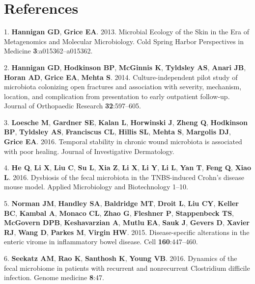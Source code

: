 \documentclass[12pt,]{article}
\begin{document}
\newpage

\section*{References}\label{references}

\hypertarget{refs}{}
\hypertarget{ref-Hannigan:2013im}{}
1. \textbf{Hannigan GD}, \textbf{Grice EA}. 2013. Microbial Ecology of
the Skin in the Era of Metagenomics and Molecular Microbiology. Cold
Spring Harbor Perspectives in Medicine \textbf{3}:a015362--a015362.

\hypertarget{ref-Hannigan:2014be}{}
2. \textbf{Hannigan GD}, \textbf{Hodkinson BP}, \textbf{McGinnis K},
\textbf{Tyldsley AS}, \textbf{Anari JB}, \textbf{Horan AD},
\textbf{Grice EA}, \textbf{Mehta S}. 2014. Culture-independent pilot
study of microbiota colonizing open fractures and association with
severity, mechanism, location, and complication from presentation to
early outpatient follow-up. Journal of Orthopaedic Research
\textbf{32}:597--605.

\hypertarget{ref-Loesche:2016ev}{}
3. \textbf{Loesche M}, \textbf{Gardner SE}, \textbf{Kalan L},
\textbf{Horwinski J}, \textbf{Zheng Q}, \textbf{Hodkinson BP},
\textbf{Tyldsley AS}, \textbf{Franciscus CL}, \textbf{Hillis SL},
\textbf{Mehta S}, \textbf{Margolis DJ}, \textbf{Grice EA}. 2016.
Temporal stability in chronic wound microbiota is associated with poor
healing. Journal of Investigative Dermatology.

\hypertarget{ref-He:2016ch}{}
4. \textbf{He Q}, \textbf{Li X}, \textbf{Liu C}, \textbf{Su L},
\textbf{Xia Z}, \textbf{Li X}, \textbf{Li Y}, \textbf{Li L}, \textbf{Yan
T}, \textbf{Feng Q}, \textbf{Xiao L}. 2016. Dysbiosis of the fecal
microbiota in the TNBS-induced Crohn's disease mouse model. Applied
Microbiology and Biotechnology 1--10.

\hypertarget{ref-Norman:2015kb}{}
5. \textbf{Norman JM}, \textbf{Handley SA}, \textbf{Baldridge MT},
\textbf{Droit L}, \textbf{Liu CY}, \textbf{Keller BC}, \textbf{Kambal
A}, \textbf{Monaco CL}, \textbf{Zhao G}, \textbf{Fleshner P},
\textbf{Stappenbeck TS}, \textbf{McGovern DPB}, \textbf{Keshavarzian A},
\textbf{Mutlu EA}, \textbf{Sauk J}, \textbf{Gevers D}, \textbf{Xavier
RJ}, \textbf{Wang D}, \textbf{Parkes M}, \textbf{Virgin HW}. 2015.
Disease-specific alterations in the enteric virome in inflammatory bowel
disease. Cell \textbf{160}:447--460.

\hypertarget{ref-Seekatz:2016fz}{}
6. \textbf{Seekatz AM}, \textbf{Rao K}, \textbf{Santhosh K},
\textbf{Young VB}. 2016. Dynamics of the fecal microbiome in patients
with recurrent and nonrecurrent Clostridium difficile infection. Genome
medicine \textbf{8}:47.
\end{document}
